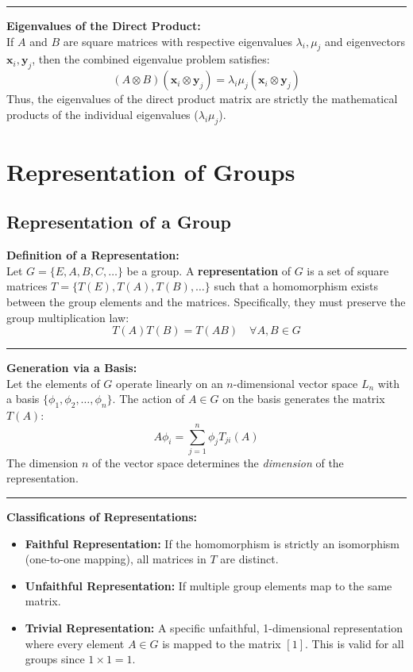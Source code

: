 \documentclass[11pt, a4paper]{report}
\begin{document}
\vspace{1em}
\hrule
\vspace{1em}

\textbf{Eigenvalues of the Direct Product:}\\
If $A$ and $B$ are square matrices with respective eigenvalues $\lambda_i, \mu_j$ and eigenvectors $\mathbf{x}_i, \mathbf{y}_j$, then the combined eigenvalue problem satisfies:
\[ (A \otimes B)(\mathbf{x}_i \otimes \mathbf{y}_j) = \lambda_i \mu_j (\mathbf{x}_i \otimes \mathbf{y}_j) \]
Thus, the eigenvalues of the direct product matrix are strictly the mathematical products of the individual eigenvalues ($\lambda_i \mu_j$).

\newpage

\chapter{Representation of Groups}
\section{Representation of a Group}

\textbf{Definition of a Representation:}\\
Let $G = \{E, A, B, C, \dots\}$ be a group. A \textbf{representation} of $G$ is a set of square matrices $T = \{T(E), T(A), T(B), \dots\}$ such that a homomorphism exists between the group elements and the matrices. Specifically, they must preserve the group multiplication law:
\[ T(A)T(B) = T(AB) \quad \forall A, B \in G \]

\vspace{1em}
\hrule
\vspace{1em}

\textbf{Generation via a Basis:}\\
Let the elements of $G$ operate linearly on an $n$-dimensional vector space $L_n$ with a basis $\{\phi_1, \phi_2, \dots, \phi_n\}$. The action of $A \in G$ on the basis generates the matrix $T(A)$:
\[ A \phi_i = \sum_{j=1}^n \phi_j T_{ji}(A) \]
The dimension $n$ of the vector space determines the \textit{dimension} of the representation.

\vspace{1em}
\hrule
\vspace{1em}

\textbf{Classifications of Representations:}
\begin{itemize}
    \item \textbf{Faithful Representation:} If the homomorphism is strictly an isomorphism (one-to-one mapping), all matrices in $T$ are distinct.
    \item \textbf{Unfaithful Representation:} If multiple group elements map to the same matrix.
    \item \textbf{Trivial Representation:} A specific unfaithful, 1-dimensional representation where every element $A \in G$ is mapped to the matrix $[1]$. This is valid for all groups since $1 \times 1 = 1$.
\end{itemize}
\end{document}
